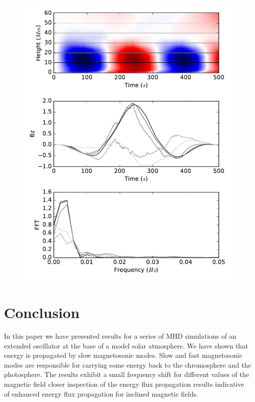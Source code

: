\documentclass{aastex62}
\begin{document}
\begin{figure}
    \label{fft_obs}
    \includegraphics[scale=0.6]{imrescale/fft_sim.pdf}
    \caption{}
\end{figure}















\section{Conclusion}

In this paper we have presented results for a series of MHD simulations of an extended oscillator at the base of a model solar atmosphere. We have shown that energy is propagated by slow magnetosonic modes. Slow and fast magnetosonic modes are responsible for carrying some energy back to the chromosphere and the photosphere. The results exhibit a small frequency shift  for different values of the magnetic field closer inspection of the energy flux propagation results indicative of enhanced energy flux propagation for inclined magnetic fields.
\end{document}

